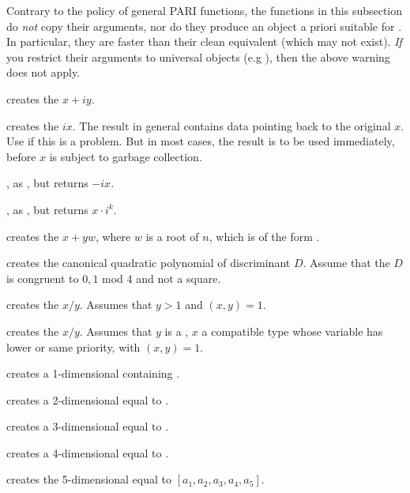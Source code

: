 \label{se:unclean}

Contrary to the policy of general PARI functions, the functions in this
subsection do \emph{not} copy their arguments, nor do they produce an object
a priori suitable for . In particular, they are
faster than their clean equivalent (which may not exist). \emph{If} you
restrict their arguments to universal objects (e.g ),
then the above warning does not apply.

 creates the  $x + iy$.

 creates the  $ix$. The result in
general contains data pointing back to the original $x$. Use  if
this is a problem. But in most cases, the result is to be used immediately,
before $x$ is subject to garbage collection.

, as , but returns $-ix$.

, as , but returns
$x \cdot i^k$.

 creates the  $x + yw$,
where $w$ is a root of $n$, which is of the form .

 creates the canonical quadratic polynomial of
discriminant $D$. Assume that the  $D$ is congruent to $0,1$ mod $4$
and not a square.

 creates the  $x/y$. Assumes that
$y > 1$ and $(x,y) = 1$.

 creates the  $x/y$. Assumes
that $y$ is a , $x$ a compatible type whose variable has lower
or same priority, with $(x,y) = 1$.

 creates a 1-dimensional  containing .

 creates a 2-dimensional  equal to
\kbd{[x,y]}.

 creates a 3-dimensional 
equal to \kbd{[x,y,z]}.

 creates a 4-dimensional 
equal to \kbd{[x,y,z,t]}.

 creates the
5-dimensional  equal to $[a_1,a_2,a_3,a_4,a_5]$.

